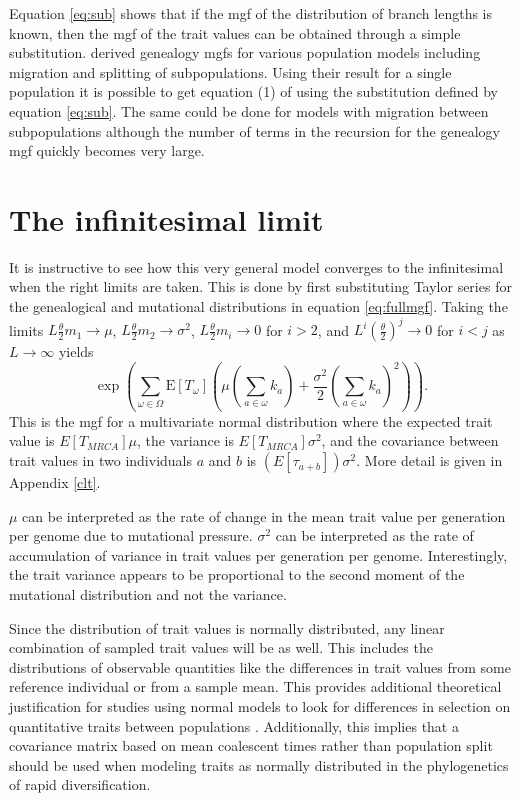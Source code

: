 \documentclass{article}
\newcommand{\T}{\frac{\theta}{2}}
\newcommand{\E}{\mathrm{E}}
\begin{document}
Equation \eqref{eq:sub} shows that if the mgf of the distribution of branch
lengths is known, then the mgf of the trait values can be obtained through a
simple substitution. \citet{Lohse2011} derived genealogy mgfs for various
population models including migration and splitting of subpopulations. Using
their result for a single population it is possible to get equation (1) of
\citet{Schraiber2015} using the substitution defined by equation \eqref{eq:sub}.
The same could be done for models with migration between subpopulations although
the number of terms in the recursion for the genealogy mgf quickly becomes very
large. 

\section{The infinitesimal limit}
It is instructive to see how this very general model converges to the
infinitesimal when the right limits are taken. This is done by first
substituting Taylor series for the genealogical and mutational distributions in
equation \eqref{eq:fullmgf}. Taking the limits $L\T m_1 \to \mu$,
$L\T m_2\to \sigma^2$, $L\T m_i\to 0$ for $i>2$, and
$L^i\left(\T\right)^j \to 0$ for $i<j$ as $L\to \infty$ yields
\begin{equation}
  \label{eq:clt}
  \exp \left( \sum_{\omega \in \Omega}\E[T_{\omega}] \left( \mu \left(
  \sum_{a \in \omega} k_a\right) + \frac{\sigma^2}{2}\left( \sum_{a \in \omega}
  k_a\right)^2\right)\right).
\end{equation}
This is the mgf for a multivariate normal distribution where the expected trait
value is $E[T_{MRCA}] \mu$, the variance is $E[T_{MRCA}]\sigma^2$, and the
covariance between trait values in two individuals $a$ and $b$ is
$(E[\tau_{a+b}]) \sigma^2$. More detail is given in Appendix \ref{clt}.

$\mu$ can be interpreted as the rate of change in the mean trait value per
generation per genome due to mutational pressure. $\sigma^2$ can be interpreted
as the rate of accumulation of variance in trait values per generation per
genome. Interestingly, the trait variance appears to be proportional to the
second moment of the mutational distribution and not the variance.

Since the distribution of trait values is normally distributed, any linear
combination of sampled trait values will be as well. This includes the
distributions of observable quantities like the differences in trait values from
some reference individual or from a sample mean. This provides additional
theoretical justification for studies using normal models to look for
differences in selection on quantitative traits between populations
\citep{Ovaskainen2011,Praebel2013,Berg2014,Robinson2015}. Additionally, this
implies that a covariance matrix based on mean coalescent times rather than
population split should be used when modeling traits as normally distributed in
the phylogenetics of rapid diversification.
\end{document}
